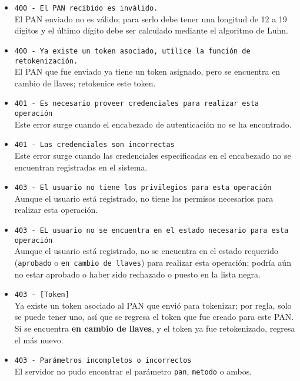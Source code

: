 \begin{itemize}

  \item \verb|400 - El PAN recibido es inválido.| \\
    El PAN enviado no es válido; para serlo debe tener una longitud de 12
    a 19 dígitos y el último dígito debe ser calculado mediante el
    algoritmo de Luhn.

  \item \verb|400 - Ya existe un token asociado, utilice la función de retokenización.| \\
    El PAN que fue enviado ya tiene un token asignado, pero se encuentra
    en cambio de llaves; retokenice este token.

  \item \verb|401 - Es necesario proveer credenciales para realizar esta operación| \\
    Este error surge cuando el encabezado de autenticación no se ha
    encontrado.

  \item \verb|401 - Las credenciales son incorrectas| \\
    Este error surge cuando las credenciales especificadas en el
    encabezado no se encuentran registradas en el sistema.

  \item \verb|403 - El usuario no tiene los privilegios para esta operación| \\
    Aunque el usuario está registrado, no tiene los permisos necesarios
    para realizar esta operación.

  \item \verb|403 - EL usuario no se encuentra en el estado necesario para esta operación| \\
    Aunque el usuario está registrado, no se encuentra en el estado
    requerido (\verb|aprobado| o \verb|en cambio de llaves|)
    para realizar esta operación; podría aún no estar aprobado o haber
    sido rechazado o puesto en la lista negra.

  \item \verb|403 - [Token]| \\
    Ya existe un token asociado al PAN que envió para tokenizar;
    por regla, solo se puede tener uno, así que se regresa el token que
    fue creado para este PAN. Si se encuentra \textbf{en cambio de llaves},
    y el token ya fue retokenizado, regresa el más nuevo.

  \item \verb|403 - Parámetros incompletos o incorrectos| \\
    El servidor no pudo encontrar el parámetro \verb|pan|,
    \verb|metodo| o ambos.

\end{itemize}

